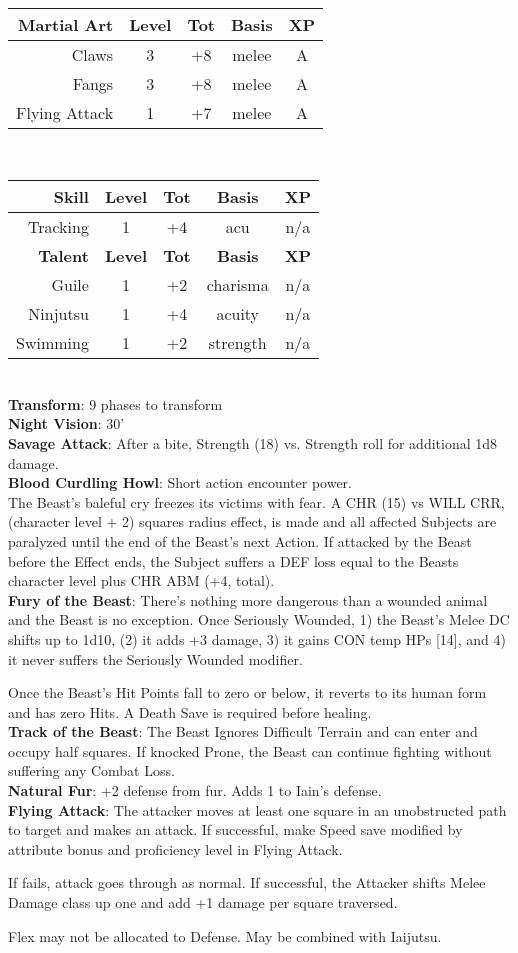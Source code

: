 \documentclass[11pt]{article}
\newcommand{\heading}[1]{{\sc\bfseries #1}}
\begin{document}
%
\\[12pt]
%
%
\begin{tabular}[t]{|r|c|c|c|c|}
\hline
%
\heading{Martial Art} & \heading{Level} & \heading{Tot} & \heading{Basis} & \heading{XP}
\\ \hline \hline
\sc Claws & 3 & +8 & melee & A
\\
\sc Fangs & 3 & +8 & melee & A
\\
\sc Flying Attack & 1 & +7 & melee & A
\\ \hline
\end{tabular}
%
\ \ \ \ \ \
%
\begin{tabular}[t]{|r|c|c|c|c|}
\hline
\heading{Skill} & \heading{Level} & \heading{Tot} & \heading{Basis} & \heading{XP}
\\ \hline \hline
\sc Tracking & 1 & +4 & acu & n/a
\\ \hline \hline
%
\heading{Talent} & \heading{Level} & \heading{Tot} & \heading{Basis} & \heading{XP}
\\ \hline \hline
\sc Guile & 1 & +2 & charisma & n/a
\\
\sc Ninjutsu & 1 & +4 & acuity & n/a
\\
\sc Swimming & 1 & +2 & strength & n/a
\\ \hline
\end{tabular}
%
\mbox{ }
\\[-12pt]
\heading{Transform}: 9 phases to transform
%
\\[4pt]
%
\heading{Night Vision}: 30'
%
\\[4pt]
%
\heading{Savage Attack}: After a bite, Strength (18) vs. Strength
roll for additional 1d8 damage.
%
\\[4pt]
%
\heading{Blood Curdling Howl}: Short action encounter power.
\\
The Beast's baleful cry freezes its victims with fear.  A CHR (15) vs
WILL CRR, (character level + 2) squares radius effect, is made and all
affected Subjects are paralyzed until the end of the Beast's next
Action.  If attacked by the Beast before the Effect ends, the Subject
suffers a DEF loss equal to the Beasts character level plus CHR ABM
(+4, total).
%
\\[4pt]
%
\heading{Fury of the Beast}: There's nothing more dangerous than a
wounded animal and the Beast is no exception.  Once Seriously
Wounded, 1) the Beast's Melee DC shifts up to 1d10, (2) it adds +3 damage,
3) it gains CON temp HPs [14], and 4) it never suffers the Seriously
Wounded modifier.

Once the Beast's Hit Points fall to zero or below, it reverts to its
human form and has zero Hits.  A Death Save is required before
healing.
%
\\[4pt]
%
\heading{Track of the Beast}: The Beast Ignores Difficult Terrain and
can enter and occupy half squares.  If knocked Prone, the Beast can
continue fighting without suffering any Combat Loss.
%
\\[4pt]
%
\heading{Natural Fur}: +2 defense from fur.  Adds 1 to Iain's defense.
%
\\[4pt]
%
\heading{Flying Attack}:  The attacker moves at least one square in an
unobstructed path to target and makes an attack.  If successful, make
Speed save modified by attribute bonus and proficiency level in Flying
Attack.

If fails, attack goes through as normal.  If successful, the Attacker
shifts Melee Damage class up one and add +1 damage per square traversed.

Flex may not be allocated to Defense.  May be combined with Iaijutsu.
\end{document}
